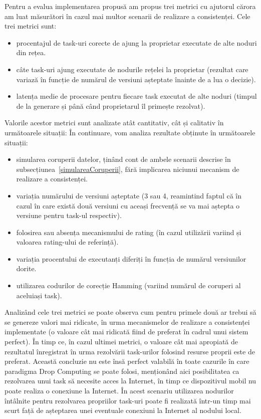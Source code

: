 \documentclass[12pt,a4paper]{report}
\begin{document}
Pentru a evalua implementarea propusă am propus trei metrici cu ajutorul cărora am luat măsurători în cazul mai multor scenarii de realizare a consistenței. Cele trei metrici sunt:
\begin{itemize}
	\item procentajul de task-uri corecte de ajung la proprietar executate de alte noduri din rețea.
	\item câte task-uri ajung executate de nodurile rețelei la proprietar (rezultat care variază în funcție de numărul de versiuni așteptate înainte de a lua o decizie).
	\item latența medie de procesare pentru fiecare task executat de alte noduri (timpul de la generare și până când proprietarul îl primește rezolvat).
\end{itemize}
Valorile acestor metrici sunt analizate atât cantitativ, cât și calitativ în următoarele situații:
În continuare, vom analiza rezultate obținute în următoarele situații:
\begin{itemize}
	\item simularea coruperii datelor, ținând cont de ambele scenarii descrise în subsecțiunea~\ref{simulareaCoruperii}, fără implicarea niciunui mecanism de realizare a consistenței.
	\item variația numărului de versiuni așteptate (3 sau 4, reamintind faptul că în cazul în care există două versiuni cu aceași frecvență se va mai aștepta o versiune pentru task-ul respectiv).
	\item folosirea sau absența mecanismului de rating (în cazul utilizării variind și valoarea rating-ului de referință).
	\item variația procentului de executanți diferiți în funcția de numărul versiunilor dorite.
	\item utilizarea codurilor de corecție Hamming (variind numărul de coruperi al aceluiași task).
\end{itemize}

Analizând cele trei metrici se poate observa cum pentru primele două ar trebui să se genereze valori mai ridicate, în urma mecanismelor de realizare a consistenței implementate (o valoare cât mai ridicată fiind de preferat în cadrul unui sistem perfect). În timp ce, în cazul ultimei metrici, o valoare cât mai apropiată de rezultatul înregistrat în urma rezolvării task-urilor folosind resurse proprii este de preferat. Această concluzie nu este însă perfect valabilă în toate cazurile în care paradigma Drop Computing se poate folosi, menționând aici posibilitatea ca rezolvarea unui task să necesite acces la Internet, în timp ce dispozitivul mobil nu poate realiza o conexiune la Internet. În acest scenariu utilizarea nodurilor întâlnite pentru rezolvarea propriilor task-uri poate fi realizată într-un timp mai scurt față de așteptarea unei eventuale conexiuni la Internet al nodului local.
\end{document}
